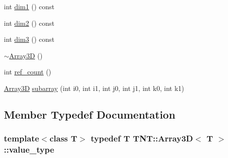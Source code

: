\begin{DoxyCompactItemize}
$$\item 
int \hyperlink{classTNT_1_1Array3D_ad75b16e73207a349a9a996659c338296}{dim1} () const 
\item 
int \hyperlink{classTNT_1_1Array3D_a458595e0b81ebbc1b193b4b737defd00}{dim2} () const 
\item 
int \hyperlink{classTNT_1_1Array3D_a0f147ed03d878ed375e21ef8a00af483}{dim3} () const 
\item 
\hyperlink{classTNT_1_1Array3D_af22e1bc22155dc84168ae00f5f26258b}{$\sim$\-Array3\-D} ()
\item 
int \hyperlink{classTNT_1_1Array3D_a50bbefb0aa842c2d7208b67fb09bb0d9}{ref\-\_\-count} ()
\item 
\hyperlink{classTNT_1_1Array3D}{Array3\-D} \hyperlink{classTNT_1_1Array3D_a365b3f6c5eb41e5189b20b25d80aee98}{subarray} (int i0, int i1, int j0, int j1, int k0, int k1)
\end{DoxyCompactItemize}


\subsection{Member Typedef Documentation}
\hypertarget{classTNT_1_1Array3D_a51945370abf416e829e6a50bdb0af6d5}{
\subsubsection[{value\-\_\-type}]{\setlength{\rightskip}{0pt plus 5cm}template$<$class T$>$ typedef T {\bf T\-N\-T\-::\-Array3\-D}$<$ T $>$\-::{\bf value\-\_\-type}}}\label{classTNT_1_1Array3D_a51945370abf416e829e6a50bdb0af6d5}


